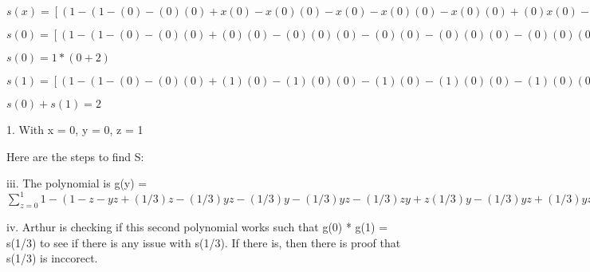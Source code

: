 \documentclass[12pt]{article}
\begin{document}
\vskip 0.3cm
$s(x) =  [(1 - (1 - (0) - (0)(0) + x(0) - x(0)(0) - x(0) - x(0)(0) - x(0)(0) + (0)x(0) - x(0)(0) + x(0)(0) + x(0)(0) - x(0)(0))) + (1 - (1 - (1) - (0)(1) + x(1) - x(0)(1) - x(0) - x(0)(1) - x(1)(0) + (1)x(0) - x(0)(1) + x(0)(1) + x(0)(1) - x(0)(1)))]
* [(1 - (1 - (0) - (1)(0) + x(0) - x(1)(0) - x(1) - x(1)(0) - x(0)(1) + (0)x(1) - x(1)(0) + x(1)(0) + x(1)(0) - x(1)(0))) + (1 - (1 - (1) - (1)(1) + x(1) - x(1)(1) - x(1) - x(1)(1) - x(1)(1) + (1)x(1) - x(1)(1) + x(1)(1) + x(1)(1) - x(1)(1)))]$

$s(0) =  [(1 - (1 - (0) - (0)(0) + (0)(0) - (0)(0)(0) - (0)(0) - (0)(0)(0) - (0)(0)(0) + (0)(0)(0) - (0)(0)(0) + (0)(0)(0) + (0)(0)(0) - (0)(0)(0))) + (1 - (1 - (1) - (0)(1) + (0)(1) - (0)(0)(1) - (0)(0) - (0)(0)(1) - (0)(1)(0) + (1)(0)(0) - (0)(0)(1) + (0)(0)(1) + (0)(0)(1) - (0)(0)(1)))]
* [(1 - (1 - (0) - (1)(0) + (0)(0) - (0)(1)(0) - (0)(1) - (0)(1)(0) - (0)(0)(1) + (0)(0)(1) - (0)(1)(0) + (0)(1)(0) + (0)(1)(0) - (0)(1)(0))) + (1 - (1 - (1) - (1)(1) + (0)(1) - (0)(1)(1) - (0)(1) - (0)(1)(1) - (0)(1)(1) + (1)(0)(1) - (0)(1)(1) + (0)(1)(1) + (0)(1)(1) - (0)(1)(1)))]$

$s(0) = 1 * (0 + 2) $

$s(1) = [(1 - (1 - (0) - (0)(0) + (1)(0) - (1)(0)(0) - (1)(0) - (1)(0)(0) - (1)(0)(0) + (0)(1)(0) - (1)(0)(0) + (1)(0)(0) + (1)(0)(0) - (1)(0)(0))) + (1 - (1 - (1) - (0)(1) + (1)(1) - (1)(0)(1) - (1)(0) - (1)(0)(1) - (1)(1)(0) + (1)(1)(0) - (1)(0)(1) + (1)(0)(1) + (1)(0)(1) - (1)(0)(1)))]
* [(1 - (1 - (0) - (1)(0) + (1)(0) - (1)(1)(0) - (1)(1) - (1)(1)(0) - (1)(0)(1) + (0)(1)(1) - (1)(1)(0) + (1)(1)(0) + (1)(1)(0) - (1)(1)(0))) + (1 - (1 - (1) - (1)(1) + (1)(1) - (1)(1)(1) - (1)(1) - (1)(1)(1) - (1)(1)(1) + (1)(1)(1) - (1)(1)(1) + (1)(1)(1) + (1)(1)(1) - (1)(1)(1)))] = 0 $

$s(0) + s(1) = 2 $

1. With x = 0, y = 0, z = 1

\vskip 0.3cm
Here are the steps to find S:

\vskip 0.3cm

iii. The polynomial is g(y) =  $\sum_{z=0}^{1} 1 - (1 - z - yz + (1/3)z - (1/3)yz - (1/3)y - (1/3)yz - (1/3)zy + z(1/3)y - (1/3)yz + (1/3)yz + (1/3)yz - (1/3)yz)$

\vskip 0.3cm

iv.  Arthur is checking if this second polynomial works such that g(0) * g(1) = s(1/3)
to see if there is any issue with s(1/3). If there is, then there is proof that
s(1/3) is inccorect.
\end{document}
